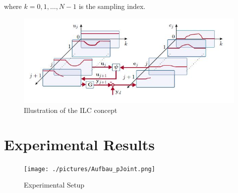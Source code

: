 \documentclass[conference]{IEEEtran}
\begin{document}
where $k = 0,1,\ldots,N-1$ is the sampling index.

\begin{figure}[tbp]
\centerline{\includegraphics{./pictures/ILCillu.jpg}}
\caption{Illustration of the ILC concept \cite{ILCGlueck2015}}
\label{fig:illuILC}
\end{figure}




\section{Experimental Results}

\begin{figure}[htbp]
  \centerline{\texttt{[image: ./pictures/Aufbau\_pJoint.png]}}
\caption{Experimental Setup}
\label{fig:ExpSetUp}
\end{figure}
\end{document}
